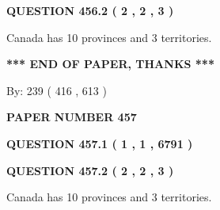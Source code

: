 \documentclass[12pt]{article}
\begin{document}
\vspace{0.2in}
  
{\textbf{\Large{QUESTION
456.2 
 ( 2 , 2 , 3 )
}}}
  
  
 
 
\noindent{}
 
 
Canada has 10  provinces and 3 territories.
 
 
 
 
   
   
 \vspace{0.2in}
 
   
   
   
   
\vspace{1.0in} 
{\textbf{\large{ *** END OF PAPER, THANKS *** }}} 
   
   
\hspace{1.0in} By: 
 239 ( 416 ,  613 )
   
   
   
   
\newpage 
\setcounter{page}{ 
   457001 } 
   
   
   
   
 {\textbf{ \Large{ PAPER NUMBER  457  }}}
   
   
\vspace{0.2in}
   
   
   
   
   
   
 \vspace{0.2in}
 
 
 
 
   
   
  
\vspace{0.2in}
  
{\textbf{\Large{QUESTION
457.1 
 ( 1 , 1 , 6791 )
}}}
  
  
  
\vspace{0.2in}
  
{\textbf{\Large{QUESTION
457.2 
 ( 2 , 2 , 3 )
}}}
  
  
 
 
\noindent{}
 
 
Canada has 10  provinces and 3 territories.
 
\end{document}
